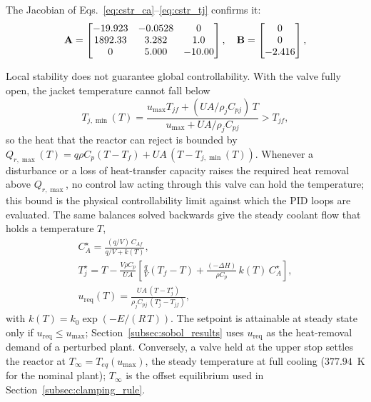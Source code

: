 \documentclass[11pt]{article}
\begin{document}
The Jacobian of Eqs.~\eqref{eq:cstr_ca}--\eqref{eq:cstr_tj} confirms it:
\begin{equation}
    \setlength{\arraycolsep}{5pt}
    \mathbf{A} = \begin{bmatrix}
        -19.923 & -0.0528 & 0 \\
        1892.33 & 3.282 & 1.0 \\
        0 & 5.000 & -10.00
    \end{bmatrix}, \quad
    \mathbf{B} = \begin{bmatrix} 0 \\ 0 \\ -2.416 \end{bmatrix},
    \label{eq:jacobian_matrices}
\end{equation}

Local stability does not guarantee global controllability. With the valve fully open, the jacket temperature cannot fall below
\begin{equation}
    T_{j,\min}(T) = \frac{u_{\max} T_{jf} + (UA/\rho_j C_{pj})\,T}{u_{\max} + UA/\rho_j C_{pj}} > T_{jf},
    \label{eq:tj_min_bound}
\end{equation}
so the heat that the reactor can reject is bounded by $Q_{r,\max}(T) = q \rho C_p (T - T_f) + UA\,(T - T_{j,\min}(T))$. Whenever a disturbance or a loss of heat-transfer capacity raises the required heat removal above $Q_{r,\max}$, no control law acting through this valve can hold the temperature; this bound is the physical controllability limit against which the PID loops are evaluated. The same balances solved backwards give the steady coolant flow that holds a temperature $T$,
\begin{equation}
    \begin{gathered}
    C_A^\star = \frac{(q/V)\,C_{Af}}{q/V + k(T)}, \\
    T_j^\star = T - \frac{V\rho C_p}{UA}\!\left[\frac{q}{V}(T_f - T) + \frac{(-\Delta H)}{\rho C_p}\,k(T)\,C_A^\star\right], \\
    u_{\mathrm{req}}(T) = \frac{UA\,(T - T_j^\star)}{\rho_j C_{pj}\,(T_j^\star - T_{jf})},
    \end{gathered}
    \label{eq:u_req}
\end{equation}
with $k(T) = k_0\exp(-E/(R\,T))$. The setpoint is attainable at steady state only if $u_{\mathrm{req}} \le u_{\max}$; Section~\ref{subsec:sobol_results} uses $u_{\mathrm{req}}$ as the heat-removal demand of a perturbed plant. Conversely, a valve held at the upper stop settles the reactor at $T_\infty = T_{eq}(u_{\max})$, the steady temperature at full cooling ($377.94$~K for the nominal plant); $T_\infty$ is the offset equilibrium used in Section~\ref{subsec:clamping_rule}.
\end{document}
